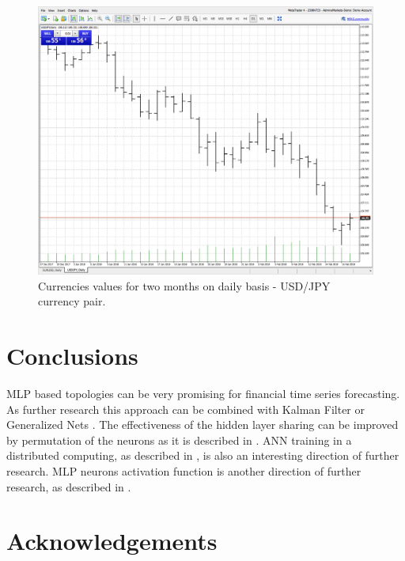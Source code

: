 \documentclass{llncs}
\begin{document}
\begin{figure}
  \includegraphics[width=1.0\linewidth]{fig03}
  \caption{Currencies values for two months on daily basis - USD/JPY currency pair.}
  \label{fig03}
\end{figure}
\FloatBarrier

\section{Conclusions} \label{Conclusions}

MLP based topologies can be very promising for financial time series forecasting. As further research this approach can be combined with Kalman Filter \cite{alexandrov01} or Generalized Nets \cite{tashev01,tashev02}. The effectiveness of the hidden layer sharing can be improved by permutation of the neurons as it is described in \cite{zankinski02}. ANN training in a distributed computing, as described in \cite{balabanov01,balabanov02,balabanov03,balabanov04,keremedchiev01,tomov01}, is also an interesting direction of further research. MLP neurons activation function is another direction of further research, as described in \cite{zankinski01}.


\section*{Acknowledgements}
\end{document}

